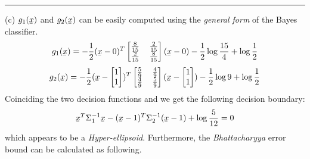 \documentclass[12pt]{article}
\numberwithin{equation}{section}
\numberwithin{table}{section}
\numberwithin{figure}{section}
\begin{document}
\noindent\rule{\textwidth}{.5pt}
(c) $g_1(\underaccent{\bar}{x})$ and $g_2(\underaccent{\bar}{x})$ can be easily computed using the \textit{general form} of the Bayes classifier.
$$
	g_1(\underaccent{\bar}{x}) = -\frac{1}{2}(\underaccent{\bar}{x} - 0)^T\renewcommand\arraystretch{1}
	\setlength\arraycolsep{6pt}\begin{bmatrix}
	\frac{8}{15} & \frac{2}{15}\\
	\frac{2}{15} & \frac{8}{15}\\
	\end{bmatrix}(\underaccent{\bar}{x} - 0) - \frac{1}{2}\log \frac{15}{4} + \log \frac{1}{2}
$$
$$
	g_2(\underaccent{\bar}{x}) = -\frac{1}{2}(\underaccent{\bar}{x} - \begin{bmatrix}
	1\\
	1\\
	\end{bmatrix})^T\renewcommand\arraystretch{1}
	\setlength\arraycolsep{6pt}\begin{bmatrix}
	\frac{5}{9} & \frac{4}{9}\\
	\frac{4}{9} & \frac{5}{9}\\
	\end{bmatrix}(\underaccent{\bar}{x} - \begin{bmatrix}
	1\\
	1\\
	\end{bmatrix}) - \frac{1}{2}\log 9 + \log \frac{1}{2}
$$
Coinciding the two decision functions and we get the following decision boundary:
$$
	\underaccent{\bar}{x}^T\Sigma_{1}^{-1}\underaccent{\bar}{x} - (\underaccent{\bar}{x} -1)^T\Sigma_{2}^{-1}(\underaccent{\bar}{x} -1) + \log \frac{5}{12} = 0
$$
which appears to be a \textit{Hyper-ellipsoid}. Furthermore, the \textit{Bhattacharyya} error bound can be calculated as following.
\end{document}
